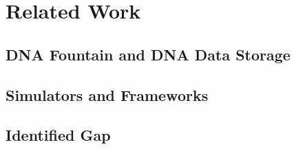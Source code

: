 \chapter{Related Work}
\label{chap:related_work}

\section{DNA Fountain and DNA Data Storage}
\label{sec:related_dna_fountain}

\section{Simulators and Frameworks}
\label{sec:related_simulators}

\section{Identified Gap}
\label{sec:identified_gap}
